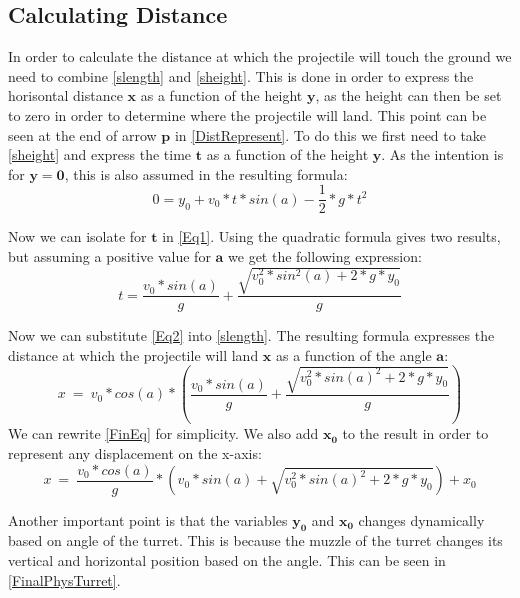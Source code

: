 \subsection{Calculating Distance}\label{CalcDist}
In order to calculate the distance at which the projectile will touch the ground
we need to combine \autoref{slength} and \autoref{sheight}. This is done in
order to express the horisontal distance $\mathbf{x}$ as a function of the
height $\mathbf{y}$, as the height can then be set to zero in order to determine
where the projectile will land. This point can be seen at the end of
arrow $\mathbf{p}$ in \autoref{DistRepresent}. To do this we first need to take
\autoref{sheight} and express the time $\mathbf{t}$ as a function of the height
$\mathbf{y}$. As the intention is for $\mathbf{y=0}$, this is also assumed in
the resulting formula:
\begin{equation}\label{Eq1}
0=y_0+v_0*t*sin(a)-\frac{1}{2}*g*t^2
\end{equation}

Now we can isolate for $\mathbf{t}$ in \autoref{Eq1}. Using the quadratic
formula gives two results, but assuming a positive value for $\mathbf{a}$ we get
the following expression:
\begin{equation}\label{Eq2}
t=\frac{v_0*sin(a)}{g}+\frac{\sqrt{v_0^2*sin^2(a)+2*g*y_0}}{g}
\end{equation}

Now we can substitute \autoref{Eq2} into \autoref{slength}. The resulting
formula expresses the distance at which the projectile will land $\mathbf{x}$ as
a function of the angle $\mathbf{a}$:
\begin{equation}\label{FinEq}
x\ =\ v_0*cos(a)* \left(\frac{v_0*sin(a)}{g} + \frac{
\sqrt{v_0^2*sin(a)^2+2*g*y_0}}{g}\right)
\end{equation}
We can rewrite \autoref{FinEq} for simplicity. We also add $\mathbf{x_0}$ to
the result in order to represent any displacement on the x-axis:
\begin{equation}\label{FinEq2}
x\ =\ \frac{v_0*cos(a)}{g}* \left(
v_0*sin(a)+\sqrt{v_0^2*sin(a)^2+2*g*y_0}\right)+x_0
\end{equation}

Another important point is that the variables $\mathbf{y_0}$ and $\mathbf{x_0}$
changes dynamically based on angle of the turret. This is because the muzzle of
the turret changes its vertical and horizontal position based on the angle. This
can be seen in \autoref{FinalPhysTurret}.

